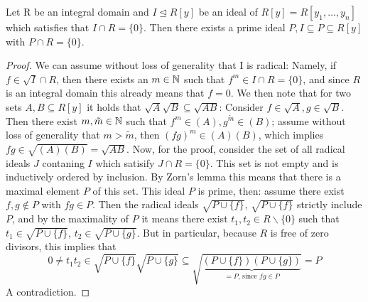 \begin{lem}\label{primeoverp1}
Let R be an integral domain and $I \unlhd R[y]$ be an ideal of $R[y] = R[y_1,\ldots,y_n]$ which satisfies that $I \cap R = \{ 0 \}$.
Then there exists a prime ideal $P, I \subseteq P \subseteq R[y] $ with $P \cap R = \{0\}$.
\begin{proof}
We can assume without loss of generality that I is radical:
Namely, if $f \in \sqrt{I} \cap R$, then there exists an $m \in \mathbb{N}$ such that $f^m \in I \cap R = \{0\}$, and since $R$ is an integral domain this already means that $f = 0$.
We then note that for two sets $A,B \subseteq R[y]$ it holds that $\sqrt{A}\sqrt{B} \subseteq \sqrt{AB}$: Consider $f \in \sqrt{A}, g \in \sqrt{B}$. Then there exist $m, \tilde m \in \mathbb{N}$ such that $f^m \in (A), g^{\tilde m} \in (B)$;
 assume without loss of generality that $m > \tilde m$, then $(fg)^m \in (A)(B)$, which implies $fg \in \sqrt{(A)(B)} = \sqrt{AB}$.
Now, for the proof, consider the set of all radical ideals $J$ contaning $I$ which satisify $J \cap R = \{0\}$. This set is not empty and is inductively ordered by inclusion.
By Zorn's lemma this means that there is a maximal element $P$ of this set. This ideal $P$ is prime, then: assume there exist $f,g \notin P$ with $fg \in P$. 
Then the radical ideals $\sqrt{P \cup \{f\}}$, $\sqrt{P \cup \{f\}}$ strictly include $P$, and by the maximality of $P$ it means there exist $t_1, t_2 \in R\backslash\{0\}$ such that
$t_1 \in \sqrt{P \cup \{f\}}$, $t_2 \in \sqrt{P \cup \{g\}}$. But in particular, because $R$ is free of zero divisors, this implies that
 \[0 \neq t_1t_2 \in \sqrt{P \cup \{f\}}\sqrt{P \cup \{g\}} \subseteq \sqrt{ \underbrace{(P \cup \{f\})(P \cup \{g\})}_{=P\text{, since }fg \in P}} = P\]
A contradiction.
\end{proof}
\end{lem}


